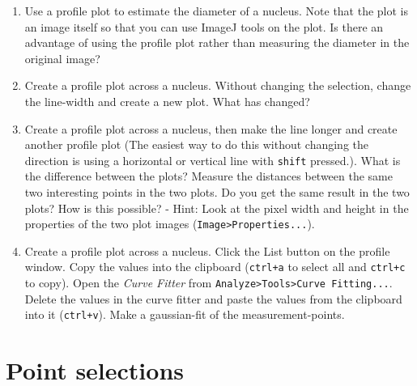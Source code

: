 \begin{enumerate}
\item Use a profile plot to estimate the diameter of a nucleus. Note that the plot is an image itself so that you can use ImageJ tools on the plot. Is there an advantage of using the profile plot rather than measuring the diameter in the original image?

\fbox{
	\begin{minipage}{\linewidth}
		\hfill\vspace{2cm}
	\end{minipage}
	}
	
\item Create a profile plot across a nucleus. Without changing the selection, change the line-width
and create a new plot. What has changed?

\fbox{
	\begin{minipage}{\linewidth}
		\hfill\vspace{2cm}
	\end{minipage}
	}
	
\item Create a profile plot across a nucleus, then make the line longer and create another profile plot (The easiest way to do this without changing the direction is using a horizontal or vertical line with \texttt{shift} pressed.). What is the difference between the plots? Measure the distances between the same two interesting points in the two plots. Do you get the same result in the two plots? How is this possible? - Hint: Look at the pixel width and height in the properties of the two plot images (\texttt{Image>Properties...}).	
	
\fbox{
	\begin{minipage}{\linewidth}
		\hfill\vspace{2cm}
	\end{minipage}
	}

\item Create a profile plot across a nucleus. Click the List button on the profile window. Copy the values into the clipboard (\texttt{ctrl+a} to select all and \texttt{ctrl+c} to copy). Open the \textit{Curve Fitter} from \texttt{Analyze>Tools>Curve Fitting...}. Delete the values in the curve fitter and paste the values from the clipboard into it (\texttt{ctrl+v}). Make a gaussian-fit of the measurement-points.	
\end{enumerate}

\section{Point selections}


